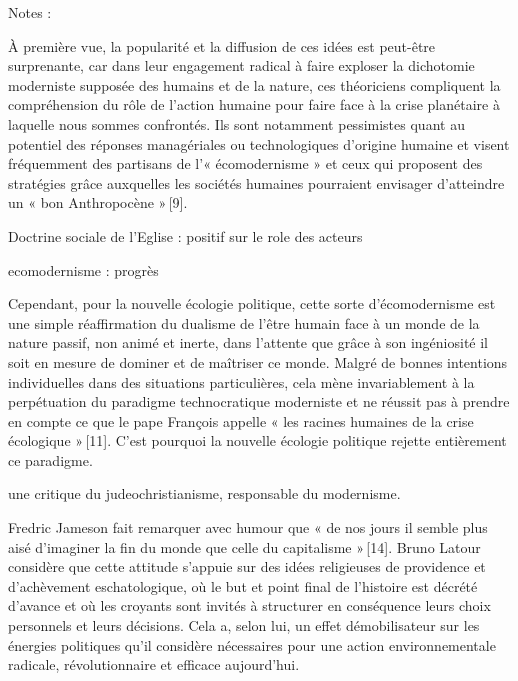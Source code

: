 Notes :

\begin{singlequote}

        À première vue, la popularité et la diffusion de ces idées est peut-être surprenante, car dans leur engagement radical à faire exploser la dichotomie moderniste supposée des humains et de la nature, ces théoriciens compliquent la compréhension du rôle de l’action humaine pour faire face à la crise planétaire à laquelle nous sommes confrontés. Ils sont notamment pessimistes quant au potentiel des réponses managériales ou technologiques d’origine humaine et visent fréquemment des partisans de l’« écomodernisme » et ceux qui proposent des stratégies grâce auxquelles les sociétés humaines pourraient envisager d’atteindre un « bon Anthropocène » [9]. 
\end{singlequote}

        Doctrine sociale de l’Eglise : positif sur le role des acteurs

        ecomodernisme : progrès
\begin{singlequote}

        Cependant, pour la nouvelle écologie politique, cette sorte d’écomodernisme est une simple réaffirmation du dualisme de l’être humain face à un monde de la nature passif, non animé et inerte, dans l’attente que grâce à son ingéniosité il soit en mesure de dominer et de maîtriser ce monde. Malgré de bonnes intentions individuelles dans des situations particulières, cela mène invariablement à la perpétuation du paradigme technocratique moderniste et ne réussit pas à prendre en compte ce que le pape François appelle « les racines humaines de la crise écologique » [11]. C’est pourquoi la nouvelle écologie politique rejette entièrement ce paradigme.
\end{singlequote}

        {une critique du judeochristianisme, responsable du modernisme.}
\begin{singlequote}

        Fredric Jameson fait remarquer avec humour que « de nos jours il semble plus aisé d’imaginer la fin du monde que celle du capitalisme » [14]. Bruno Latour considère que cette attitude s’appuie sur des idées religieuses de providence et d’achèvement eschatologique, où le but et point final de l’histoire est décrété d’avance et où les croyants sont invités à structurer en conséquence leurs choix personnels et leurs décisions. Cela a, selon lui, un effet démobilisateur sur les énergies politiques qu’il considère nécessaires pour une action environnementale radicale, révolutionnaire et efficace aujourd’hui.
\end{singlequote}

